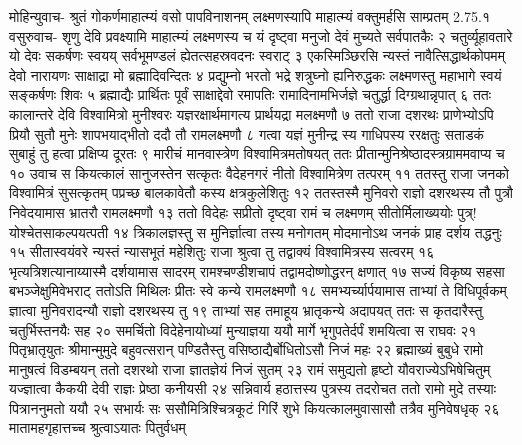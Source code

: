 
\notes{}
\textlink{}
\translink{}

\storymeta


मोहिन्युवाच-
श्रुतं गोकर्णमाहात्म्यं वसो पापविनाशनम्
लक्ष्मणस्यापि माहात्म्यं वक्तुमर्हसि साम्प्रतम् 2.75.१
वसुरुवाच-
शृणु देवि प्रवक्ष्यामि माहात्म्यं लक्ष्मणस्य च
यं दृष्ट्वा मनुजो देवं मुच्यते सर्वपातकैः २
चतुर्व्यूहावतारे यो देवः सकर्षणः स्वयय्
सर्वभूमण्डलं ह्येतत्सहस्रवदनः स्वराट् ३
एकस्मिञ्छिरसि न्यस्तं नावैत्सिद्धार्थकोपमम्
देवो नारायणः साक्षाद्रा मो ब्रह्मादिवन्दितः ४
प्रद्युम्नो भरतो भद्रे शत्रुघ्नो ह्यनिरुद्धकः
लक्ष्मणस्तु महाभागे स्वयं सङ्कर्षणः शिवः ५
ब्रह्माद्यैः प्रार्थितः पूर्वं साक्षाद्देवो रमापतिः
रामादिनामभिर्जज्ञे चतुर्द्धा दिग्ग्रथान्नृपात् ६
ततः कालान्तरे देवि विश्वामित्रो मुनीश्वरः
यज्ञरक्षार्थमागत्य प्रार्थयद्रा मलक्ष्मणौ ७
ततो राजा दशरथः प्राणेभ्योऽपि प्रियौ सुतौ
मुनेः शापभयाद्भीतो ददौ तौ रामलक्ष्मणौ ८
गत्वा यज्ञं मुनीन्द्र स्य गाधिपस्य ररक्षतुः
सताडकं सुबाहुं तु हत्वा प्रक्षिप्य दूरतः ९
मारीचं मानवास्त्रेण विश्वामित्रमतोषयत्
ततः प्रीतान्मुनिश्रेष्ठादस्त्रग्राममवाप्य च १०
उवाच स कियत्कालं सानुजस्तेन सत्कृतः
वैदेहनगरं नीतो विश्वामित्रेण तत्परम् ११
ततस्तु राजा जनको विश्वामित्रं सुसत्कृतम्
पप्रच्छ बालकावेतौ कस्य क्षत्रकुलेशितुः १२
ततस्तस्मै मुनिवरो राज्ञो दशरथस्य तौ
पुत्रौ निवेदयामास भ्रातरौ रामलक्ष्मणौ १३
ततो विदेहः सप्रीतो दृष्ट्वा रामं च लक्ष्मणम्
सीतोर्मिलाख्ययोः पुत्र्! योश्चेतसाकल्पयत्पती १४
त्रिकालज्ञस्तु स मुनिर्ज्ञात्वा तस्य मनोगतम्
मोदमानोऽथ जनकं प्राह दर्शय तद्धनुः १५
सीतास्वयंवरे न्यस्तं न्यासभूतं महेशितुः
राजा श्रुत्वा तु तद्वाक्यं विश्वामित्रस्य सत्वरम् १६
भृत्यत्रिशत्यानाय्यास्मै दर्शयामास सादरम्
रामश्चण्डीशचापं तद्वामदोष्णोद्धरन् क्षणात् १७
सज्यं विकृष्य सहसा बभञ्जेक्षुमिवेभराट्
ततोऽति मिथिलः प्रीतः स्वे कन्ये रामलक्ष्मणौ १८
समभ्यर्च्यार्पयामास ताभ्यां ते विधिपूर्वकम्
ज्ञात्वा मुनिवरादन्यौ राज्ञो दशरथस्य तु १९
ताभ्यां सह तमाहूय भ्रातृकन्ये अदापयत्
ततः स कृतदारैस्तु चतुर्भिस्तनयैः सह २०
समर्चितो विदेहेनायोध्यां मुन्याज्ञया ययौ
मार्गे भृगुपतेर्दर्पं शमयित्वा स राघवः २१
पितृभ्रातृयुतः श्रीमान्मुमुदे बहुवत्सरान्
पण्डितैस्तु वसिष्ठाद्यैर्बोधितोऽसौ निजं महः २२
ब्रह्माख्यं बुबुधे रामो मानुषत्वं विडम्बयन्
ततो दशरथो राजा ज्ञातज्ञेयं निजं सुतम् २३
रामं समुद्यतो हृष्टो यौवराज्येऽभिषेचितुम्
यज्ज्ञात्वा कैकयी देवी राज्ञः प्रेष्ठा कनीयसी २४
सन्निवार्य हठात्तस्य पुत्रस्य तदरोचत
ततो रामो मुदे तस्याः पित्राननुमतो ययौ २५
सभार्यः सः ससौमित्रिश्चित्रकूटं गिरिं शुभे
कियत्कालमुवासासौ तत्रैव मुनिवेषधृक् २६
मातामहगृहात्तच्च श्रुत्वाऽयातः पितुर्वधम्
